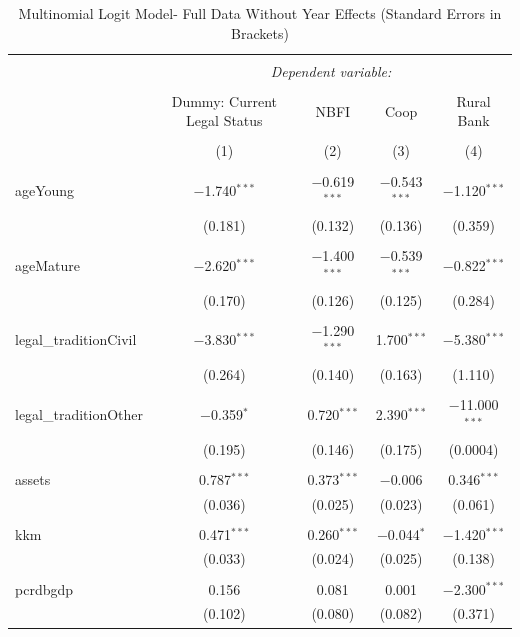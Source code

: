 \documentclass[a4paper, nobind]{templates/ociamthesis}
\begin{document}
\begin{table}[!htbp] \centering 
  \caption{Multinomial Logit Model- Full Data Without Year Effects (Standard Errors in Brackets)} 
  \label{} 
\footnotesize 
\begin{tabular}{@{\extracolsep{5pt}}lcccc} 
\\[-1.8ex]\hline 
\hline \\[-1.8ex] 
 & \multicolumn{4}{c}{\textit{Dependent variable:}} \\ 
\cline{2-5} 
\\[-1.8ex] & Dummy: Current Legal Status & NBFI & Coop & Rural Bank \\ 
\\[-1.8ex] & (1) & (2) & (3) & (4)\\ 
\hline \\[-1.8ex] 
 ageYoung & $-$1.740$^{***}$ & $-$0.619$^{***}$ & $-$0.543$^{***}$ & $-$1.120$^{***}$ \\ 
  & (0.181) & (0.132) & (0.136) & (0.359) \\ 
  & & & & \\ 
 ageMature & $-$2.620$^{***}$ & $-$1.400$^{***}$ & $-$0.539$^{***}$ & $-$0.822$^{***}$ \\ 
  & (0.170) & (0.126) & (0.125) & (0.284) \\ 
  & & & & \\ 
 legal\_traditionCivil & $-$3.830$^{***}$ & $-$1.290$^{***}$ & 1.700$^{***}$ & $-$5.380$^{***}$ \\ 
  & (0.264) & (0.140) & (0.163) & (1.110) \\ 
  & & & & \\ 
 legal\_traditionOther & $-$0.359$^{*}$ & 0.720$^{***}$ & 2.390$^{***}$ & $-$11.000$^{***}$ \\ 
  & (0.195) & (0.146) & (0.175) & (0.0004) \\ 
  & & & & \\ 
 assets & 0.787$^{***}$ & 0.373$^{***}$ & $-$0.006 & 0.346$^{***}$ \\ 
  & (0.036) & (0.025) & (0.023) & (0.061) \\ 
  & & & & \\ 
 kkm & 0.471$^{***}$ & 0.260$^{***}$ & $-$0.044$^{*}$ & $-$1.420$^{***}$ \\ 
  & (0.033) & (0.024) & (0.025) & (0.138) \\ 
  & & & & \\ 
 pcrdbgdp & 0.156 & 0.081 & 0.001 & $-$2.300$^{***}$ \\ 
  & (0.102) & (0.080) & (0.082) & (0.371) \\ 

\end{tabular}
\end{table}
\end{document}
